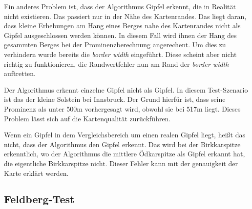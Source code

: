 Ein anderes Problem ist, dass der Algorithmus Gipfel erkennt, die in Realität nicht existieren. Das passiert nur in der Nähe des Kartenrandes. Das liegt daran, dass kleine Erhebungen am Hang eines Berges nahe des Kartenrandes nicht als Gipfel ausgeschlossen  werden können. In diesem Fall wird ihnen der Hang des gesammten Berges bei der Prominenzberechnung angerechent.  Um dies zu verhindern wurde bereits die \textit{border width} eingeführt. Diese scheint aber nicht richtig zu funktionieren, die Randwertfehler nun am Rand der \textit{border width} auftretten.


Der Algorithmus erkennt einzelne Gipfel nicht als Gipfel. In diesem Test-Szenario ist das der kleine Solstein bei Innsbruck. Der Grund hierfür ist, dass seine Prominenz als unter 500m vorhergesagt wird, obwohl sie bei 517m liegt. Dieses Problem lässt sich auf die Kartenqualität zurückführen. 

Wenn ein Gipfel in dem Vergleichsbereich um einen realen Gipfel liegt, heißt das nicht, dass der Algorithmus den Gipfel erkennt. Das wird bei der Birkkarspitze erkenntlich, wo der Algorithmus die mittlere Ödkarspitze als Gipfel erkannt hat, die eigentliche Birkkarspitze nicht. Dieser Fehler kann mit der genauigkeit der Karte erklärt werden. 

\subsection{Feldberg-Test}


